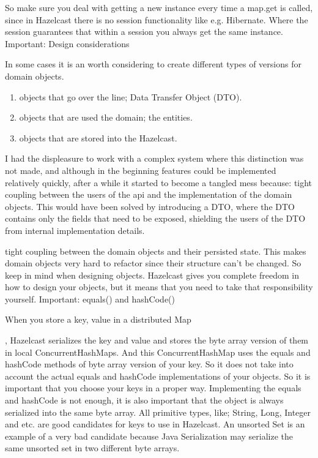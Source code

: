 So make sure you deal with getting a new instance every time a map.get is called, since in Hazelcast there is no session functionality like e.g. Hibernate. Where the session guarantees that within a session you always get the same instance. 
Important: Design considerations

In some cases it is an worth considering to create different types of versions for domain objects.
\begin{enumerate}
\item objects that go over the line; Data Transfer Object (DTO).
\item objects that are used the domain; the entities.
\item objects that are stored into the Hazelcast.
\end{enumerate}

I had the displeasure to work with a complex system where this distinction was not made, and although in the beginning features could be implemented relatively quickly, after a while it started to become a tangled mess because:
tight coupling between the users of the api and the implementation of the domain objects. This would have been solved by introducing a DTO, where the DTO contains only the fields that need to be exposed, shielding the users of the DTO from internal implementation details.

tight coupling between the domain objects and their persisted state. This makes domain objects very hard to refactor since their structure can't be changed.
So keep in mind when designing objects. Hazelcast gives you complete freedom in how to design your objects, but it means that you need to take that responsibility yourself.
Important: equals() and hashCode()

When you store a key, value in a distributed Map

, Hazelcast serializes the key and value and stores the byte array version of them in local ConcurrentHashMaps. And this ConcurrentHashMap uses the equals and hashCode methods of byte array version of your key. So it does not take into account the actual equals and hashCode implementations of your objects. So it is important that you choose your keys in a proper way. Implementing the equals and hashCode is not enough, it is also important that the object is always serialized into the same byte array. All primitive types, like; String, Long, Integer and etc. are good candidates for keys to use in Hazelcast. An unsorted Set is an example of a very bad candidate because Java Serialization may serialize the same unsorted set in two different byte arrays.

